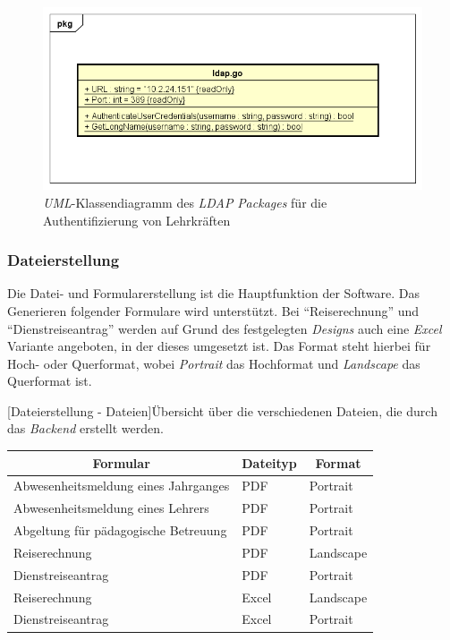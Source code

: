 \begin{figure}[H]
	\centering
	\includegraphics[width=\linewidth]{images/mbeier_konzept/LDAP}
	\caption[\textit{lLDAP} \textit{UML}-Klassendiagramm]{\textit{UML}-Klassendiagramm des \textit{LDAP} \textit{Packages} für die Authentifizierung von Lehrkräften}
	\label{fig:ldap}
\end{figure}

\newpage

\subsubsection{Dateierstellung}

Die Datei- und Formularerstellung ist die Hauptfunktion der Software. Das Generieren folgender Formulare wird unterstützt. Bei \enquote{Reiserechnung} und \enquote{Dienstreiseantrag} werden auf Grund des festgelegten \textit{Designs} auch eine \textit{Excel} Variante angeboten, in der dieses umgesetzt ist. Das Format steht hierbei für Hoch- oder Querformat, wobei \textit{Portrait} das Hochformat und \textit{Landscape} das Querformat ist.

[Dateierstellung - Dateien]{Übersicht über die verschiedenen Dateien, die durch das \textit{Backend} erstellt werden.}	
\label{tbl:files}
\begin{table}
	\centering
	\begin{tabular}{|l|l|l|}
		\hline
		\multicolumn{1}{|c|}{\textbf{Formular}} & \multicolumn{1}{c|}{\textbf{Dateityp}} & \multicolumn{1}{c|}{\textbf{Format}} \\ \hline
		Abwesenheitsmeldung eines Jahrganges & PDF & Portrait \\ \hline
		Abwesenheitsmeldung eines Lehrers & PDF & Portrait \\ \hline
		Abgeltung für pädagogische Betreuung & PDF & Portrait \\ \hline
		Reiserechnung & PDF & Landscape \\ \hline
		Dienstreiseantrag & PDF & Portrait \\ \hline
		Reiserechnung & Excel & Landscape \\ \hline
		Dienstreiseantrag & Excel & Portrait \\ \hline
	\end{tabular}
\end{table}

